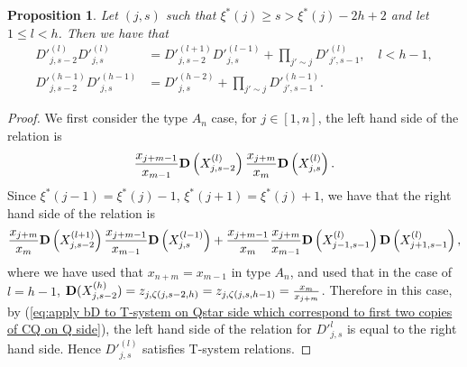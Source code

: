 \documentclass[10pt,a4paper]{amsart}
\newtheorem{proposition}{Proposition}
\newcommand{\xistar}{\xi^{*}}
\begin{document}
\begin{proposition} \label{prop : T-systems}
    Let $(j,s)$ such that $\xistar(j) \geq s > \xistar(j)-2h+2$ and let $1 \leq l < h$. Then we have that
\begin{align*}
  {D'}_{j,s-2}^{(l)} {D'}_{j,s}^{(l)} &= {D'}_{j,s-2}^{(l+1)} {D'}_{j,s}^{(l-1)} + \prod_{j' \sim j} {D'}_{j',s-1}^{(l)}, \quad l<h-1, \\
{D'}_{j,s-2}^{(h-1)} {D'}_{j,s}^{(h-1)} &=  {D'}_{j,s}^{(h-2)} + \prod_{j' \sim j} {D'}_{j',s-1}^{(h-1)}.
\end{align*}    
    \end{proposition}

\begin{proof}





We first consider the type $A_n$ case, for $j \in [1,n]$, the left hand side of the relation is
\begin{align*}
\frac{x_{j+m-1}}{x_{m-1}} {\bf D}\left( X_{j,s-2}^{(l)} \right) \frac{x_{j+m}}{x_{m}} {\bf D}\left( X_{j,s}^{(l)} \right). 
\end{align*}
Since $\xi^*(j-1) = \xi^*(j)-1$, $\xi^*(j+1) = \xi^*(j)+1$, we have that the right hand side of the relation is 
\begin{align*}
\frac{x_{j+m}}{x_{m}} {\bf D}\left( X_{j,s-2}^{(l+1)} \right) \frac{x_{j+m-1}}{x_{m-1}} {\bf D}\left( X_{j,s}^{(l-1)} \right) + \frac{x_{j+m-1}}{x_{m}} \frac{x_{j+m}}{x_{m-1}} {\bf D}\left( X_{j-1,s-1}^{(l)} \right)  {\bf D}\left( X_{j+1,s-1}^{(l)} \right),
\end{align*}
where we have used that $x_{n+m}=x_{m-1}$ in type $A_n$, and used that in the case of $l=h-1$, ${\bf D}(X_{j,s-2}^{(h)}) = z_{j, \zeta(j,s-2,h)} = z_{j, \zeta(j,s,h-1)} = \frac{x_m}{x_{j+m}}$.  
Therefore in this case, by (\ref{eq:apply bD to T-system on Qstar side which correspond to first two copies of CQ on Q side}), the left hand side of the relation for ${D'}_{j,s}^{l}$ is equal to the right hand side. Hence ${D'}_{j,s}^{(l)}$ satisfies T-system relations.


\end{proof}
\end{document}
